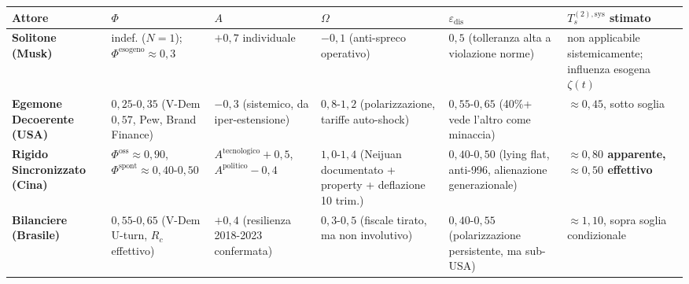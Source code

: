 {\def\LTcaptype{none} %
{\small\begin{longtable}[]{@{}
  >{\raggedright\arraybackslash}p{}
  >{\raggedright\arraybackslash}p{}
  >{\raggedright\arraybackslash}p{}
  >{\raggedright\arraybackslash}p{}
  >{\raggedright\arraybackslash}p{}
  >{\raggedright\arraybackslash}p{}@{}}
\toprule\noalign{}
\begin{minipage}[b]{\linewidth}\raggedright
Attore
\end{minipage} & \begin{minipage}[b]{\linewidth}\raggedright
\(\Phi\)
\end{minipage} & \begin{minipage}[b]{\linewidth}\raggedright
\(A\)
\end{minipage} & \begin{minipage}[b]{\linewidth}\raggedright
\(\Omega\)
\end{minipage} & \begin{minipage}[b]{\linewidth}\raggedright
\(\varepsilon_{\text{dis}}\)
\end{minipage} & \begin{minipage}[b]{\linewidth}\raggedright
\(T_s^{(2),\text{sys}}\) stimato
\end{minipage} \\
\midrule\noalign{}
\endhead
\bottomrule\noalign{}
\endlastfoot
\textbf{Solitone (Musk)} & indef. (\(N=1\));
\(\Phi^{\text{esogeno}} \approx 0{,}3\) & \(+0{,}7\) individuale &
\(-0{,}1\) (anti-spreco operativo) & \(0{,}5\) (tolleranza alta a
violazione norme) & non applicabile sistemicamente; influenza esogena
\(\zeta(t)\) \\
\textbf{Egemone Decoerente (USA)} & \(0{,}25\)-\(0{,}35\) (V-Dem
\(0{,}57\), Pew, Brand Finance) & \(-0{,}3\) (sistemico, da
iper-estensione) & \(0{,}8\)-\(1{,}2\) (polarizzazione, tariffe
auto-shock) & \(0{,}55\)-\(0{,}65\) (40\%+ vede l'altro come minaccia) &
\textbf{\(\approx 0{,}45\)}, sotto soglia \\
\textbf{Rigido Sincronizzato (Cina)} &
\(\Phi^{\text{oss}} \approx 0{,}90\),
\(\Phi^{\text{spont}} \approx 0{,}40\)-\(0{,}50\) &
\(A^{\text{tecnologico}} +0{,}5\), \(A^{\text{politico}} -0{,}4\) &
\(1{,}0\)-\(1{,}4\) (Neijuan documentato + property + deflazione 10
trim.) & \(0{,}40\)-\(0{,}50\) (lying flat, anti-996, alienazione
generazionale) & \textbf{\(\approx 0{,}80\) apparente,
\(\approx 0{,}50\) effettivo} \\
\textbf{Bilanciere (Brasile)} & \(0{,}55\)-\(0{,}65\) (V-Dem U-turn,
\(R_c\) effettivo) & \(+0{,}4\) (resilienza 2018-2023 confermata) &
\(0{,}3\)-\(0{,}5\) (fiscale tirato, ma non involutivo) &
\(0{,}40\)-\(0{,}55\) (polarizzazione persistente, ma sub-USA) &
\textbf{\(\approx 1{,}10\)}, sopra soglia condizionale \\
\end{longtable}}
}

